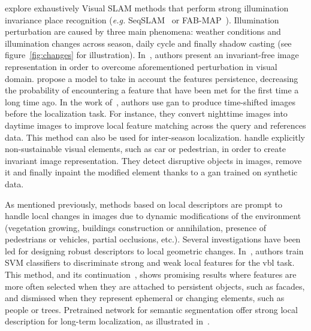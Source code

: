 			\citet[Section VII]{Lowry2016} explore exhaustively Visual SLAM methods that perform strong illumination invariance place recognition (\textit{e.g.} SeqSLAM~\citep{Milford2012,Pepperell2014,Pepperell2016} or FAB-MAP~\citep{Cummins2008,Cummins2010,Paul2010}). Illumination perturbation are caused by three main phenomena: weather conditions and illumination changes across season, daily cycle and finally shadow casting (see figure~\ref{fig:changes} for illustration). In~\citep{Lowry2016a}, authors present an invariant-free image representation in order to overcome aforementioned perturbation in visual domain. \citet{Rosen2016} propose a model to take in account the features persistence, decreasing the probability of encountering a feature that have been met for the first time a long time ago. In the work of~\citet{Porav2018}, authors use \ac{gan} to produce time-shifted images before the localization task. For instance, they convert nighttime images into daytime images to improve local feature matching across the query and references data. This method can also be used for inter-season localization. \citet{Bescos2019} handle explicitly non-sustainable visual elements, such as car or pedestrian, in order to create invariant image representation. They detect disruptive objects in images, remove it and finally inpaint the modified element thanks to a \ac{gan} trained on synthetic data.
			
			As mentioned previously, methods based on local descriptors are prompt to handle local changes in images due to dynamic modifications of the environment (\eg vegetation growing, buildings construction or annihilation, presence of pedestrians or vehicles, partial occlusions, etc.). Several investigations have been led for designing robust descriptors to local geometric changes. In~\citep{Kim2015,Linegar2016}, authors train SVM classifiers to discriminate strong and weak local features for the \ac{vbl} task. This method, and its continuation~\citep{Kim2017}, shows promising results where features are more often selected when they are attached to persistent objects, such as facades, and dismissed when they represent ephemeral or changing elements, such as people or trees. Pretrained network for semantic segmentation offer strong local description for long-term localization, as illustrated in~\citep{Mousavian2015,Garg2018a,Toft2018,Shi2019,Schonberger2017a}.
			
